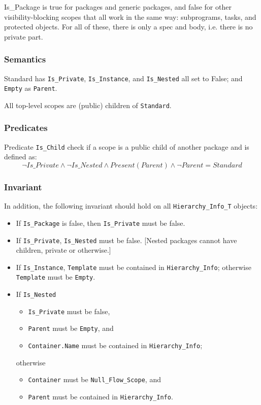 \documentclass{article}
\begin{document}
Is\_Package is true for packages and generic packages, and false for other
visibility-blocking scopes that all work in the same way: subprograms,
tasks, and protected objects. For all of these, there is only a spec and
body, i.e. there is no private part.

\subsubsection{Semantics}
Standard has \verb|Is_Private|, \verb|Is_Instance|, and \verb|Is_Nested|
all set to False; and \verb|Empty| as \verb|Parent|.

All top-level scopes are (public) children of \verb|Standard|.

\subsubsection{Predicates}
Predicate \verb|Is_Child| check if a scope is a public child of another
package and is defined as:
\begin{equation*}
  \lnot Is\_Private \land
  \lnot Is\_Nested \land
  Present (Parent) \land
  \lnot Parent = Standard
\end{equation*}

\subsubsection{Invariant}
In addition, the following invariant should hold on all
\verb|Hierarchy_Info_T| objects:

\begin{itemize}
\item If \verb|Is_Package| is false, then \verb|Is_Private| must be false.

\item If \verb|Is_Private|, \verb|Is_Nested| must be false. [Nested
  packages cannot have children, private or otherwise.]

\item If \verb|Is_Instance|, \verb|Template| must be contained in
  \verb|Hierarchy_Info|; otherwise \verb|Template| must be
  \verb|Empty|.

\item If \verb|Is_Nested|
  \begin{itemize}
  \item \verb|Is_Private| must be false,
  \item \verb|Parent| must be \verb|Empty|, and
  \item \verb|Container.Name| must be contained in \verb|Hierarchy_Info|;
  \end{itemize}
  otherwise
  \begin{itemize}
  \item \verb|Container| must be \verb|Null_Flow_Scope|, and
  \item \verb|Parent| must be contained in \verb|Hierarchy_Info|.
  \end{itemize}
\end{itemize}
\end{document}
